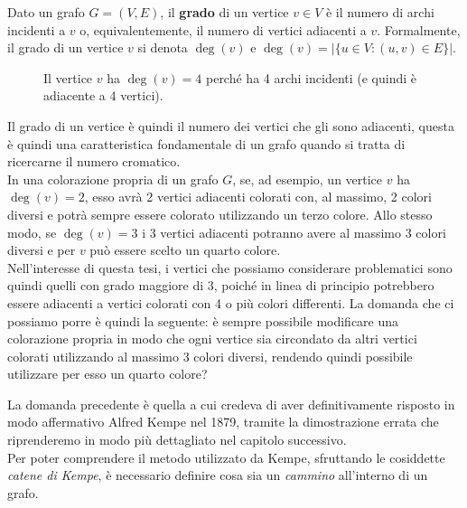 \documentclass[a4paper,12pt,titlepage]{report}
\begin{document}
	\begin{dfn}
		Dato un grafo $G = (V, E)$, il {\bfseries grado} di un vertice $v \in V$ è il numero di archi incidenti a $v$ o, equivalentemente, il numero di vertici adiacenti a $v$. Formalmente, il grado di un vertice $v$ si denota $\deg(v)$ e $\deg(v) = \lvert \{u \in V : (u,v) \in E\}\rvert$.
	\end{dfn}
	\begin{figure}[h]
		\centering
		\vspace{0.5cm}
		\caption{Il vertice $v$ ha $\deg(v) = 4$ perché ha 4 archi incidenti (e quindi è adiacente a 4 vertici).}
	\end{figure}
	\noindent Il grado di un vertice è quindi il numero dei vertici che gli sono adiacenti, questa è quindi una caratteristica fondamentale di un grafo quando si tratta di ricercarne il numero cromatico.
	\\In una colorazione propria di un grafo $G$, se, ad esempio, un vertice $v$ ha $\deg(v) = 2$, esso avrà 2 vertici adiacenti colorati con, al massimo, 2 colori diversi e potrà sempre essere colorato utilizzando un terzo colore. Allo stesso modo, se $\deg(v) = 3$ i 3 vertici adiacenti potranno avere al massimo 3 colori diversi e per $v$ può essere scelto un quarto colore.
	\\Nell'interesse di questa tesi, i vertici che possiamo considerare problematici sono quindi quelli con grado maggiore di 3, poiché in linea di principio potrebbero essere adiacenti a vertici colorati con 4 o più colori differenti. La domanda che ci possiamo porre è quindi la seguente: è sempre possibile modificare una colorazione propria in modo che ogni vertice sia circondato da altri vertici colorati utilizzando al massimo 3 colori diversi, rendendo quindi possibile utilizzare per esso un quarto colore?
	\vspace{0.5cm}
	
	La domanda precedente è quella a cui credeva di aver definitivamente risposto in modo affermativo Alfred Kempe nel 1879, tramite la dimostrazione errata che riprenderemo in modo più dettagliato nel capitolo successivo.
	\\Per poter comprendere il metodo utilizzato da Kempe, sfruttando le cosiddette \emph{catene di Kempe}, è necessario definire cosa sia un \emph{cammino} all'interno di un grafo.
	
\end{document}
